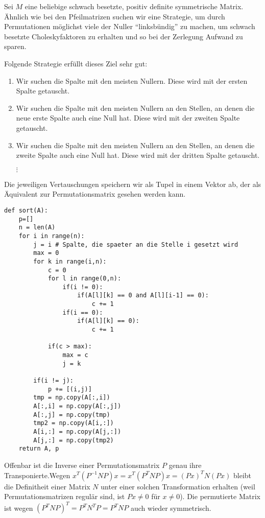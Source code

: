 Sei $M$ eine beliebige schwach besetzte, positiv definite symmetrische Matrix. Ähnlich wie bei den Pfeilmatrizen suchen wir eine Strategie, um durch Permutationen möglichst viele der Nuller "`linksbündig"' zu machen, um schwach besetzte Choleskyfaktoren zu erhalten und so bei der Zerlegung Aufwand zu sparen.

Folgende Strategie erfüllt dieses Ziel sehr gut:

\begin{enumerate}
    \item Wir suchen die Spalte mit den meisten Nullern. Diese wird mit der ersten Spalte getauscht.
    \item Wir suchen die Spalte mit den meisten Nullern an den Stellen, an denen die neue erste Spalte auch eine Null hat. Diese wird mit der zweiten Spalte getauscht.
    \item Wir suchen die Spalte mit den meisten Nullern an den Stellen, an denen die zweite Spalte auch eine Null hat. Diese wird mit der dritten Spalte getauscht.

    $\vdots$
\end{enumerate}

Die jeweiligen Vertauschungen speichern wir als Tupel in einem Vektor ab, der als Äquivalent zur Permutationsmatrix gesehen werden kann.

\lstset{language=Python}
\lstset{frame=lines}
\lstset{basicstyle=\footnotesize}
\begin{lstlisting}
def sort(A):
    p=[]
    n = len(A)
    for i in range(n):
        j = i # Spalte, die spaeter an die Stelle i gesetzt wird
        max = 0
        for k in range(i,n):
            c = 0
            for l in range(0,n):
                if(i != 0):
                    if(A[l][k] == 0 and A[l][i-1] == 0):
                        c += 1
                if(i == 0):
                    if(A[l][k] == 0):
                        c += 1

            if(c > max):
                max = c
                j = k

        if(i != j):
            p += [(i,j)]
        tmp = np.copy(A[:,i])
        A[:,i] = np.copy(A[:,j])
        A[:,j] = np.copy(tmp)
        tmp2 = np.copy(A[i,:])
        A[i,:] = np.copy(A[j,:])
        A[j,:] = np.copy(tmp2)
    return A, p
\end{lstlisting}

Offenbar ist die Inverse einer Permutationsmatrix $P$ genau ihre Transponierte.\newline Wegen $x^T (P^{-1}NP) x = x^T (P^TNP) x = (Px)^T N (Px)$ bleibt die Definitheit einer Matrix $N$ unter einer solchen Transformation erhalten (weil Permutationsmatrizen regulär sind, ist $Px \neq 0$ für $x \neq 0$).
Die permutierte Matrix ist wegen $(P^TNP)^T = P^TN^TP = P^TNP$ auch wieder symmetrisch.


